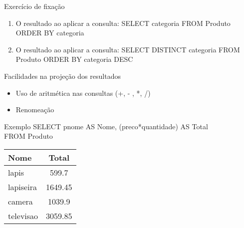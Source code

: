 \documentclass[aspectratio=169]{beamer}
\begin{document}
			\begin{frame}{Exercício de fixação}
				\begin{enumerate}
					\item O resultado ao aplicar a consulta: {\ttfamily SELECT categoria FROM Produto ORDER BY categoria}
					\item O resultado ao aplicar a consulta: {\ttfamily SELECT DISTINCT categoria FROM Produto ORDER BY categoria DESC}
				\end{enumerate}
			
			\end{frame}
	
			\begin{frame}{Facilidades na projeção dos resultados}
				\BlankLine\BlankLine
				\begin{itemize}
					\item Uso de aritmética nas consultas (+, - , *, /)
					\item Renomeação
				\end{itemize}
				
				\begin{block}{Exemplo}
					{\ttfamily
						SELECT pnome AS Nome, (preco*quantidade) AS Total\\
						FROM Produto\\
					}
				\end{block}
				\begin{table}
					\begin{tabular}{|l|c|}
						\toprule
						\textbf{Nome} & \textbf{Total} \\ \midrule
						lapis         &     599.7      \\ \midrule
						lapiseira     &    1649.45     \\ \midrule
						camera        &     1039.9     \\ \midrule
						televisao     &    3059.85     \\ \bottomrule
					\end{tabular}
				\end{table}
			\end{frame}
			
\end{document}
